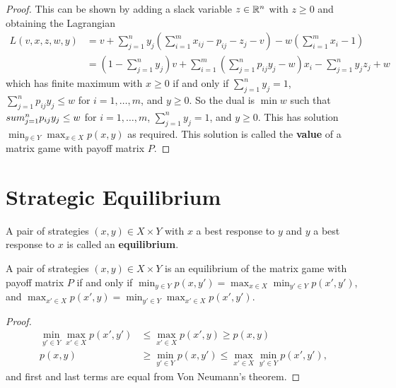 \begin{proof}
  This can be shown by adding a slack variable $z \in \mathbb{R}^{n}$ with $z
  \geq 0$ and obtaining the Lagrangian
  \begin{align}
    \label{eq:15}
    L(v, x, z, w, y) &= v + \sum_{j=1}^{n} y_{j}(\sum_{i=1}^{m} x_{ij}
    - p_{ij} - z_{j} - v) - w(\sum_{i=1}^{m} x_{i} - 1) \\
    &= (1 - \sum_{j=1}^{n} y_{j}) v + \sum_{i=1}^{m} (\sum_{j=1}^{n}
    p_{ij} y_{j} - w)x_{i} - \sum_{j=1}^{n} y_{j} z_{j} + w
  \end{align} which has finite maximum with $x \geq 0$ if and only if
  $\sum_{j=1}^{n} y_{j} = 1$, $\sum_{j=1}^{n} p_{ij} y_{j} \leq w$ for
  $ i = 1, \dots, m$, and $y \geq 0$. So the dual is $\min w$ such
  that $\\sum_{j=1}^{n} p_{ij} y_{j} \leq w$ for $i = 1, \dots, m$,
  $\sum_{j=1}^{n} y_{j} = 1$, and $y \geq 0$. This has solution
  $\min_{y \in Y} \max_{x \in X} p(x, y)$ as required. This solution
  is called the \textbf{value} of a matrix game with payoff matrix
  $P$.
\end{proof}


\section{Strategic Equilibrium}
\label{sec:strat-equil}

\begin{defn}
  \label{sec:strat-equil-1}
  A pair of strategies $(x, y) \in X \times Y$ with $x$ a best
  response to $y$ and $y$ a best response to $x$ is called an
  \textbf{equilibrium}.
\end{defn}

\begin{thm}
  \label{sec:strat-equil-2}
  A pair of strategies $(x, y) \in X \times Y$ is an equilibrium of
  the matrix game with payoff matrix $P$ if and only if $\min_{y \in
    Y} p(x, y') = \max_{x \in X} \min_{y' \in Y} p(x', y')$, and
  $\max_{x' \in X} p(x', y) = \min_{y' \in Y} \max_{x' \in X} p(x', y')$.
\end{thm}

\begin{proof}
  \begin{align}
    \min_{y' \in Y} \max_{x' \in X} p(x', y') &\leq \max_{x' \in X}
    p(x', y) \geq p(x, y) \\
    p(x, y) &\geq \min_{y' \in Y} p(x, y') \leq \max_{x'
      \in X} \min_{y' \in Y} p(x', y'),
  \end{align}
  and first and last terms are equal from Von Neumann's theorem.
\end{proof}

